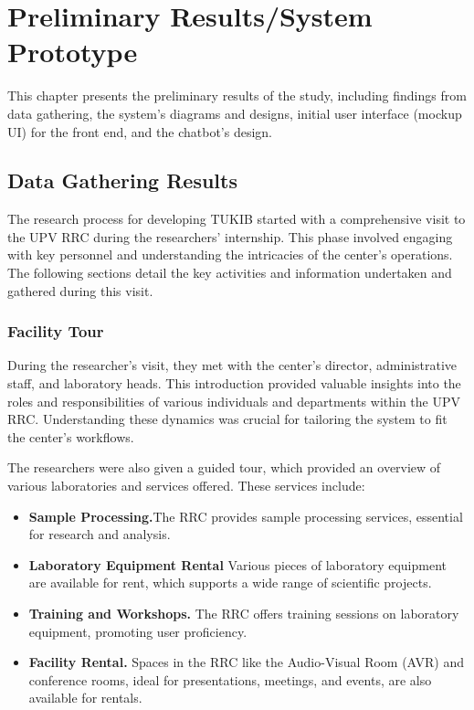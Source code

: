 \chapter{Preliminary Results/System Prototype}
This chapter presents the preliminary results of the study, including findings from data gathering, the system's diagrams and designs, initial user interface (mockup UI) for the front end, and the chatbot's design.

\section{Data Gathering Results}
The research process for developing TUKIB started with a comprehensive visit to the UPV RRC during the researchers' internship. This phase involved engaging with key personnel and understanding the intricacies of the center's operations. The following sections detail the key activities and information undertaken and gathered during this visit.

\subsection{Facility Tour}
During the researcher's visit, they met with the center's director, administrative staff, and laboratory heads. This introduction provided valuable insights into the roles and responsibilities of various individuals and departments within the UPV RRC. Understanding these dynamics was crucial for tailoring the system to fit the center’s workflows.

The researchers were also given a guided tour, which provided an overview of various laboratories and services offered. These services include:

\begin{itemize}
	\item \textbf{Sample Processing.}The RRC provides sample processing services, essential for research and analysis.
	\item \textbf{Laboratory Equipment Rental} Various pieces of laboratory equipment are available for rent, which supports a wide range of scientific projects.
	\item \textbf{Training and Workshops.} The RRC offers training sessions on laboratory equipment, promoting user proficiency.
	\item \textbf{Facility Rental.} Spaces in the RRC like the Audio-Visual Room (AVR) and conference rooms, ideal for presentations, meetings, and events, are also available for rentals.
\end{itemize}

